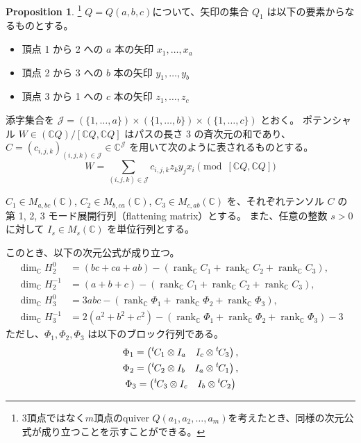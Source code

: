 \documentclass[uplatex,12pt,dvipdfmx]{jsarticle}
\theoremstyle{definition}
\newtheorem{proposition}[definition]{Proposition}
\numberwithin{equation}{section}
\newcommand{\Complex}{\mathbb{C}}
\DeclareMathOperator{\rank}{rank}
\newcommand{\transpose}[1]{{\vphantom{#1}}^t \hspace{-1pt}#1}
\begin{document}
\begin{proposition}
	\footnote{
		$3$頂点ではなく$m$頂点のquiver $Q(a_1, a_2, \ldots, a_m)$を考えたとき、同様の次元公式が成り立つことを示すことができる。
	}
	$Q=Q(a,b,c)$について、矢印の集合 $Q_1$ は以下の要素からなるものとする。
	\begin{itemize}
		\item 頂点 1 から 2 への $a$ 本の矢印 $x_1, \ldots, x_a$
		\item 頂点 2 から 3 への $b$ 本の矢印 $y_1, \ldots, y_b$
		\item 頂点 3 から 1 への $c$ 本の矢印 $z_1, \ldots, z_c$
	\end{itemize}
	添字集合を $\mathcal{J} = (\{1,\ldots,a\}) \times (\{1,\ldots,b\}) \times (\{1,\ldots,c\})$ とおく。
	ポテンシャル $W \in (\Complex Q)/[\Complex Q,\Complex Q]$ はパスの長さ 3 の斉次元の和であり、$C = (c_{i,j,k})_{(i,j,k)\in\mathcal{J}} \in \Complex^\mathcal{J}$ を用いて次のように表されるものとする。
	\[ W = \sum_{(i,j,k)\in\mathcal{J}} c_{i,j,k} z_k y_j x_i \pmod{[\Complex Q,\Complex Q]} \]
	
	$C_1 \in M_{a, bc}(\Complex)$, $C_2 \in M_{b, ca}(\Complex)$, $C_3 \in M_{c, ab}(\Complex)$ を、それぞれテンソル $C$ の第 1, 2, 3 モード展開行列（flattening matrix）とする。
	また、任意の整数 $s > 0$ に対して $I_s \in M_s(\Complex)$ を単位行列とする。
	
	このとき、以下の次元公式が成り立つ。
	\begin{align}
		\dim_\Complex H_2^0 &= (bc + ca + ab) - (\rank_\Complex C_1 + \rank_\Complex C_2 + \rank_\Complex C_3), \\
		\dim_\Complex H_2^{-1} &= (a + b + c) - (\rank_\Complex C_1 + \rank_\Complex C_2 + \rank_\Complex C_3), \\
		\dim_\Complex H_3^0 &= 3abc - (\rank_\Complex \Phi_1 + \rank_\Complex \Phi_2 + \rank_\Complex \Phi_3), \\
		\dim_\Complex H_3^{-1} &= 2(a^2 + b^2 + c^2) - (\rank_\Complex \Phi_1 + \rank_\Complex \Phi_2 + \rank_\Complex \Phi_3) - 3
	\end{align}
	ただし、$\Phi_1, \Phi_2, \Phi_3$ は以下のブロック行列である。
	\begin{gather}
		\Phi_1 = \begin{pmatrix} \transpose{C_1} \otimes I_a & I_c \otimes \transpose{C_3} \end{pmatrix}, \\
		\Phi_2 = \begin{pmatrix} \transpose{C_2} \otimes I_b & I_a \otimes \transpose{C_1} \end{pmatrix}, \\
		\Phi_3 = \begin{pmatrix} \transpose{C_3} \otimes I_c & I_b \otimes \transpose{C_2} \end{pmatrix}
	\end{gather}
\end{proposition}
\end{document}
